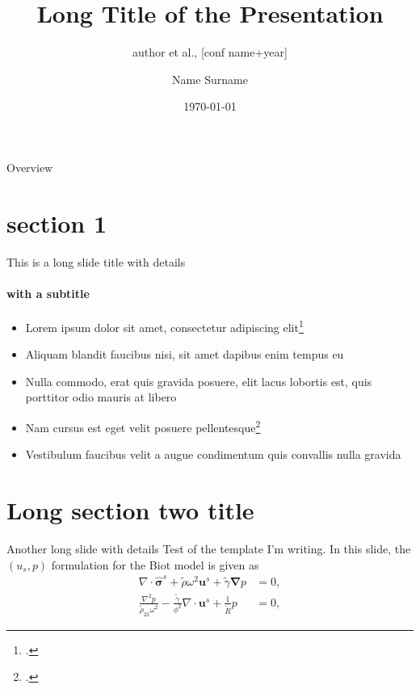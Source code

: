 \documentclass[aspectratio=169,xcolor=dvipsnames, t]{beamer}
\title[short title]{Long Title of the Presentation}
\subtitle{author et al., [conf name+year]}
\author[Surname]{Name Surname}
\institute[lab]{Name of the lab and/or institution}
\date{\today} %
\begin{document}
\begin{frame}[plain]
    \maketitle
\end{frame}
\begin{frame}[plain]{Overview}
    \tableofcontents
\end{frame}

\section{section 1}
\begin{frame}[t]{This is a long slide title with details}
    \framesubtitle{with a subtitle}
    \begin{itemize}
        \item Lorem ipsum dolor sit amet, consectetur adipiscing elit\footcite{adamou2004}
        \item Aliquam blandit faucibus nisi, sit amet dapibus enim tempus eu
        \item Nulla commodo, erat quis gravida posuere, elit lacus lobortis est, quis porttitor odio mauris at libero
        \item Nam cursus est eget velit posuere pellentesque\footcite{kiefer2019}
        \item Vestibulum faucibus velit a augue condimentum quis convallis nulla gravida
    \end{itemize}
\end{frame}
\section{Long section two title}
\begin{frame}[t]{Another long slide with details}
    Test of the template I'm writing. In this slide, the $(u_s, p)$ formulation for the Biot model is given as 
    \begin{equation}
        \begin{aligned}
            \nabla \cdot \boldsymbol{\hat{\sigma}}^s + \tilde \rho \omega^2 \boldsymbol u^s + \tilde \gamma \boldsymbol \nabla p &= 0, \\
            \frac{\nabla^2 p}{\tilde \rho_{22} \omega^2} - \frac{\tilde \gamma}{\phi^2} \nabla \cdot \boldsymbol u^s + \frac{1}{\tilde R}p &= 0,
        \end{aligned}
        \label{eq:up_motion_equations}
    \end{equation}    
\end{frame}
\end{document}
